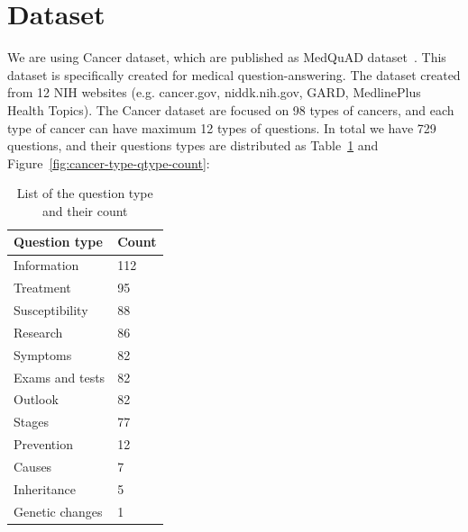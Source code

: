 \section*{Dataset}
	 We are using Cancer dataset, which are published as MedQuAD dataset~\cite{DBLP:journals/corr/abs-1901-08079}. This dataset is specifically created for medical question-answering. The dataset created from 12 NIH websites (e.g. cancer.gov, niddk.nih.gov, GARD, MedlinePlus Health Topics). The Cancer dataset are focused on 98 types of cancers, and each type of cancer can have maximum 12 types of questions. In total we have 729 questions, and their questions types are distributed as Table~\ref{tab:count-qtypes} and Figure~\ref{fig:cancer-type-qtype-count}:
 	\begin{table}[b]
	\caption{List of the question type and their count}
	\label{tab:count-qtypes}
 		\begin{tabular}{ll}
 			\toprule
 			Question type&Count\\
 			\midrule
 			Information & 112\\
 			Treatment & 95\\
 			Susceptibility & 88\\
 			Research & 86\\
 			Symptoms & 82\\
 			Exams and tests & 82\\
 			Outlook & 82\\
 			Stages & 77\\
 			Prevention & 12\\
 			Causes & 7\\
 			Inheritance & 5\\
 			Genetic changes & 1\\
 			\bottomrule
 		\end{tabular}
 	\end{table}

